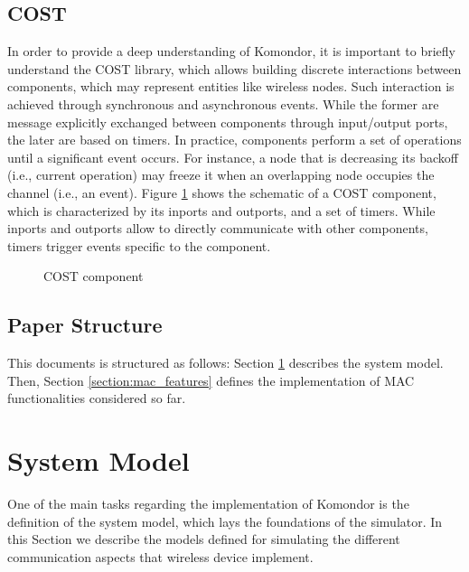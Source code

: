 \documentclass[a4paper]{article}
\begin{document}
	\subsection{COST}
	\label{section:cost}
	In order to provide a deep understanding of Komondor, it is important to briefly understand the COST library, which allows building discrete interactions between components, which may represent entities like wireless nodes. Such interaction is achieved through synchronous and asynchronous events. While the former are message explicitly exchanged between components through input/output ports, the later are based on timers. In practice, components perform a set of operations until a significant event occurs. For instance, a node that is decreasing its backoff (i.e., current operation) may freeze it when an overlapping node occupies the channel (i.e., an event). Figure \ref{fig:cost} shows the schematic of a COST component, which is characterized by its inports and outports, and a set of timers. While inports and outports allow to directly communicate with other components, timers trigger events specific to the component.
	\begin{figure}[h!]
		\centering
		\caption{COST component}
		\label{fig:cost}
	\end{figure}	
	
	\subsection{Paper Structure}
	\label{section:structure}
	This documents is structured as follows: Section \ref{section:system_model} describes the system model. Then, Section \ref{section:mac_features} defines the implementation of MAC functionalities considered so far.
	
\section{System Model}
\label{section:system_model}
One of the main tasks regarding the implementation of Komondor is the definition of the system model, which lays the foundations of the simulator. In this Section we describe the models defined for simulating the different communication aspects that wireless device implement.
	
\end{document}
